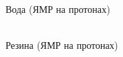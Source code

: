 \documentclass[a4paper,12pt]{article} %
\begin{document}
\begin{figure}[h!]
\begin{minipage}[h!]{0.45\linewidth}
 Вода (ЯМР на протонах) \\
\end{minipage}
\hfill
\begin{minipage}[h!]{0.45\linewidth}
 \\ Резина (ЯМР на протонах)
\end{minipage}
\vfill
\begin{minipage}[h!]{0.45\linewidth}

\end{minipage}
\end{figure}
\end{document}
